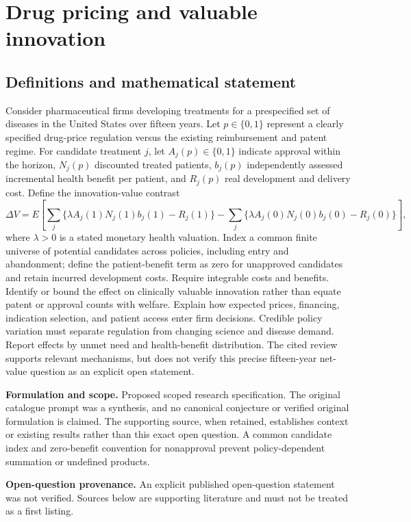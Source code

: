 \documentclass[11pt]{article}
\begin{document}
\section*{Drug pricing and valuable innovation}\label{30007727}
\subsection{Definitions and mathematical statement}
Consider pharmaceutical firms developing treatments for a prespecified set of diseases in the United States over fifteen years. Let \(p\in\{0,1\}\) represent a clearly specified drug-price regulation versus the existing reimbursement and patent regime. For candidate treatment \(j\), let \(A_j(p)\in\{0,1\}\) indicate approval within the horizon, \(N_j(p)\) discounted treated patients, \(b_j(p)\) independently assessed incremental health benefit per patient, and \(R_j(p)\) real development and delivery cost. Define the innovation-value contrast
\[\Delta V=E\!\left[\sum_j\{\lambda A_j(1)N_j(1)b_j(1)-R_j(1)\}-\sum_j\{\lambda A_j(0)N_j(0)b_j(0)-R_j(0)\}\right],\]
where \(\lambda>0\) is a stated monetary health valuation. Index a common finite universe of potential candidates across policies, including entry and abandonment; define the patient-benefit term as zero for unapproved candidates and retain incurred development costs. Require integrable costs and benefits. Identify or bound the effect on clinically valuable innovation rather than equate patent or approval counts with welfare. Explain how expected prices, financing, indication selection, and patient access enter firm decisions. Credible policy variation must separate regulation from changing science and disease demand. Report effects by unmet need and health-benefit distribution. The cited review supports relevant mechanisms, but does not verify this precise fifteen-year net-value question as an explicit open statement.

\par\textbf{Formulation and scope.} Proposed scoped research specification. The original catalogue prompt was a synthesis, and no canonical conjecture or verified original formulation is claimed. The supporting source, when retained, establishes context or existing results rather than this exact open question. A common candidate index and zero-benefit convention for nonapproval prevent policy-dependent summation or undefined products.

\par\textbf{Open-question provenance.} An explicit published open-question statement was not verified. Sources below are supporting literature and must not be treated as a first listing.
\end{document}
